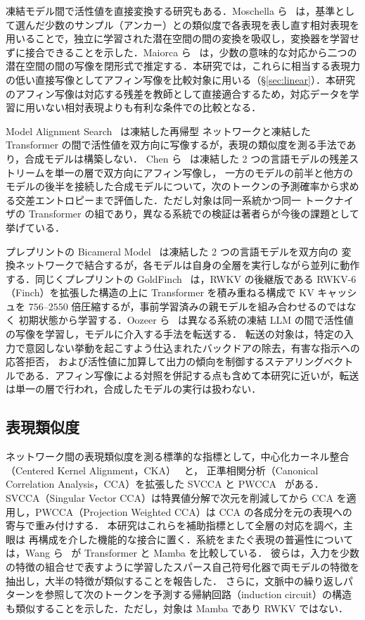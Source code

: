 \documentclass[techrep,noauthor]{ipsj}
\newcommand{\rev}[1]{{\color{blue}#1}}
\newcommand{\revr}[1]{{\color{red}#1}}
\newcommand{\revp}[1]{{\color{violet}#1}}
\begin{document}
凍結モデル間で活性値を直接\rev{変換}する研究もある．\rev{Moschella ら~\cite{moschella2023relative} は，基準として選んだ少数のサンプル（アンカー）との類似度で各表現を表し直す相対表現を用いることで，独立に学習された潜在空間の間の変換を吸収し，\rev{変換器}を学習せずに接合できることを示した．}Maiorca ら~\cite{3666122.3668540} は，少数の意味的な対応から二つの潜在空間の間の写像を閉形式で推定する．\revr{本研究では，これらに相当する表現力の低い直接写像としてアフィン写像を比較対象に用いる（\S\ref{sec:linear}）．本研究のアフィン写像は対応する残差を教師として直接適合するため，対応データを学習に用いない相対表現よりも有利な条件での比較となる．}

Model Alignment Search~\cite{grant2025model} は凍結した再帰型
ネットワークと凍結した Transformer の間で活性値を双方向に写像するが，表現の類似度を測る手法であり，合成モデルは構築しない．
Chen ら~\cite{chen2025transferring} は凍結した 2 つの言語モデルの残差ストリームを単一の層で双方向にアフィン写像し，
\revp{一方のモデルの前半と他方のモデルの後半}を接続した合成モデルについて，\rev{次のトークンの予測確率から求める交差エントロピー}まで評価した．ただし対象は同一系統かつ同一
トークナイザの Transformer の組であり，異なる系統での検証は著者らが今後の課題として挙げている．

プレプリントの
Bicameral Model~\cite{flamant2026bicameralmodelbidirectionalhiddenstate} は凍結した 2 つの言語モデルを双方向の
\rev{変換ネットワーク}で結合するが，各モデルは自身の全層を実行しながら並列に動作する．同じくプレプリントの GoldFinch~\cite{goldstein2024goldfinchhighperformancerwkvtransformer} は，RWKV の後継版である RWKV-6（Finch）を拡張した構造の上に
Transformer を積み重ねる構成で KV キャッシュを $756$--$2550$ 倍圧縮するが，事前学習済みの親モデルを組み合わせるのではなく
\rev{初期状態から}学習する．\rev{Oozeer ら~\cite{oozeer2025activation} は異なる系統の凍結 LLM の間で活性値の写像を学習し，モデルに介入する手法を転送する．
転送の対象は，特定の入力で意図しない挙動を起こすよう仕込まれたバックドアの除去，有害な指示への応答拒否，
および活性値に加算して出力の傾向を制御するステアリングベクトルである．}\revp{アフィン写像による対照}を併記する点も含めて本研究に近いが，転送は単一の層で行われ，合成したモデルの実行は扱わない．

\subsection{表現類似度}
\rev{ネットワーク間の表現類似度を測る標準的な指標として，中心化カーネル整合（Centered Kernel Alignment，CKA）~\cite{pmlr-v97-kornblith19a} と，
正準相関分析（Canonical Correlation Analysis，CCA）を拡張した SVCCA と PWCCA~\cite{3295222.3295356,3327345.3327475} がある．
SVCCA（Singular Vector CCA）は特異値分解で次元を削減してから CCA を適用し，PWCCA（Projection Weighted CCA）は CCA の各成分を元の表現への寄与で重み付けする．}
本研究はこれらを補助指標として全層の対応を調べ，主眼は
再構成を介した機能的な接合に置く．\rev{系統をまたぐ表現の普遍性については，Wang ら~\cite{wang2025towards} が Transformer と Mamba を比較している．
彼らは，入力を少数の特徴の組合せで表すように学習したスパース自己符号化器で両モデルの特徴を抽出し，大半の特徴が類似することを報告した．
さらに，文脈中の繰り返しパターンを参照して次のトークンを予測する帰納回路（induction circuit）の構造も類似することを示した．}ただし，対象は Mamba であり RWKV ではない．
\end{document}
